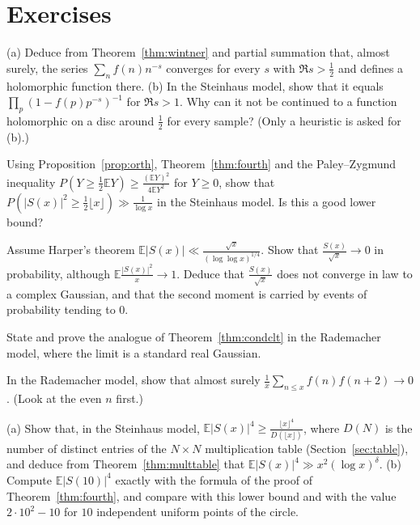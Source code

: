 

\section{Exercises}

\begin{exercise}[$\star$]\label{ex:dirichlet}
(a) Deduce from Theorem~\ref{thm:wintner} and partial summation that, almost surely, the series $\sum_nf(n)n^{-s}$ converges for every $s$ with $\Re s>\frac12$ and defines a holomorphic function there. (b) In the Steinhaus model, show that it equals $\prod_p(1-f(p)p^{-s})^{-1}$ for $\Re s>1$. Why can it not be continued to a function holomorphic on a disc around $\frac12$ for every sample? (Only a heuristic is asked for (b).)
\end{exercise}

\begin{exercise}[$\star$]\label{ex:pz}
Using Proposition~\ref{prop:orth}, Theorem~\ref{thm:fourth} and the Paley--Zygmund inequality $P(Y\ge\frac12\mathbb EY)\ge\frac{(\mathbb EY)^2}{4\mathbb EY^2}$ for $Y\ge0$, show that $P(|S(x)|^2\ge\frac12\lfloor x\rfloor)\gg\frac1{\log x}$ in the Steinhaus model. Is this a good lower bound?
\end{exercise}

\begin{exercise}[$\star\star$]\label{ex:notgauss}
Assume Harper's theorem $\mathbb E|S(x)|\ll\frac{\sqrt x}{(\log\log x)^{1/4}}$. Show that $\frac{S(x)}{\sqrt x}\to0$ in probability, although $\mathbb E\frac{|S(x)|^2}x\to1$. Deduce that $\frac{S(x)}{\sqrt x}$ does not converge in law to a complex Gaussian, and that the second moment is carried by events of probability tending to $0$.
\end{exercise}

\begin{exercise}[$\star\star$]\label{ex:rademacherclt}
State and prove the analogue of Theorem~\ref{thm:condclt} in the Rademacher model, where the limit is a standard real Gaussian.
\end{exercise}

\begin{exercise}[$\star$]\label{ex:shifttwo}
In the Rademacher model, show that almost surely $\frac1x\sum_{n\le x}f(n)f(n+2)\to0$. (Look at the even $n$ first.)
\end{exercise}

\begin{exercise}[$\star$]\label{ex:tablelink}
(a) Show that, in the Steinhaus model, $\mathbb E|S(x)|^4\ge\frac{\lfloor x\rfloor^4}{D(\lfloor x\rfloor)}$, where $D(N)$ is the number of distinct entries of the $N\times N$ multiplication table (Section~\ref{sec:table}), and deduce from Theorem~\ref{thm:multtable} that $\mathbb E|S(x)|^4\gg x^2(\log x)^\delta$. (b) Compute $\mathbb E|S(10)|^4$ exactly with the formula of the proof of Theorem~\ref{thm:fourth}, and compare with this lower bound and with the value $2\cdot10^2-10$ for $10$ independent uniform points of the circle.
\end{exercise}

